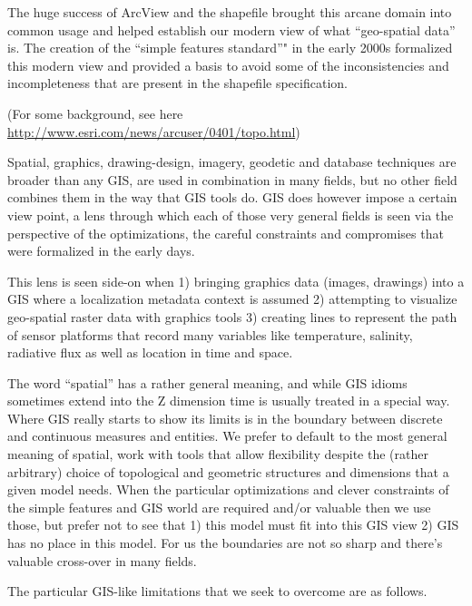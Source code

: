 \documentclass[]{book}
\theoremstyle{definition}
\theoremstyle{definition}
\theoremstyle{definition}
\theoremstyle{remark}
\begin{document}
The huge success of ArcView and the shapefile brought this arcane domain
into common usage and helped establish our modern view of what
``geo-spatial data'' is. The creation of the ``simple features
standard''" in the early 2000s formalized this modern view and provided
a basis to avoid some of the inconsistencies and incompleteness that are
present in the shapefile specification.

(For some background, see here
\url{http://www.esri.com/news/arcuser/0401/topo.html})

Spatial, graphics, drawing-design, imagery, geodetic and database
techniques are broader than any GIS, are used in combination in many
fields, but no other field combines them in the way that GIS tools do.
GIS does however impose a certain view point, a lens through which each
of those very general fields is seen via the perspective of the
optimizations, the careful constraints and compromises that were
formalized in the early days.

This lens is seen side-on when 1) bringing graphics data (images,
drawings) into a GIS where a localization metadata context is assumed 2)
attempting to visualize geo-spatial raster data with graphics tools 3)
creating lines to represent the path of sensor platforms that record
many variables like temperature, salinity, radiative flux as well as
location in time and space.

The word ``spatial'' has a rather general meaning, and while GIS idioms
sometimes extend into the Z dimension time is usually treated in a
special way. Where GIS really starts to show its limits is in the
boundary between discrete and continuous measures and entities. We
prefer to default to the most general meaning of spatial, work with
tools that allow flexibility despite the (rather arbitrary) choice of
topological and geometric structures and dimensions that a given model
needs. When the particular optimizations and clever constraints of the
simple features and GIS world are required and/or valuable then we use
those, but prefer not to see that 1) this model must fit into this GIS
view 2) GIS has no place in this model. For us the boundaries are not so
sharp and there's valuable cross-over in many fields.

The particular GIS-like limitations that we seek to overcome are as
follows.
\end{document}

